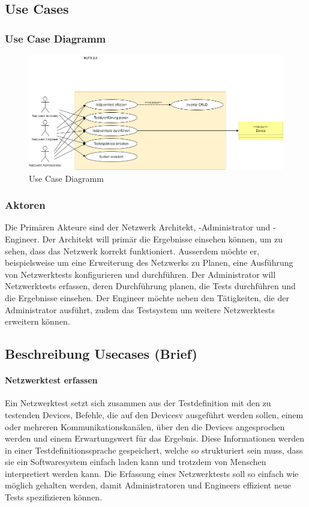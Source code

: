 \documentclass[]{subfiles}
\begin{document}
    \newpage

    \subsection{Use Cases}
    \subsubsection{Use Case Diagramm}
    \begin{figure}[!h] 
        \centering
        \includegraphics[scale=0.5]{../../99_Vorlagen/Bilder/UseCaseDiagram.png}
        \caption{Use Case Diagramm}
    \end{figure}
    \subsubsection{Aktoren}
    Die Primären Akteure sind der Netzwerk Architekt, -Administrator und -Engineer. 
    Der Architekt will primär die Ergebnisse einsehen können, um zu sehen, dass
    das Netzwerk korrekt funktioniert. 
    Ausserdem möchte er, beispielsweise um eine Erweiterung des Netzwerks zu 
    Planen, eine Ausführung von Netzwerktests konfigurieren und durchführen.
    Der Administrator will Netzwerktests erfassen, deren Durchführung planen, 
    die Tests durchführen und die Ergebnisse einsehen.
    Der Engineer möchte neben den Tätigkeiten, die der Administrator ausführt,
    zudem das Testsystem um weitere Netzwerktests erweitern können.

    \subsection{Beschreibung Usecases (Brief)}

        \paragraph{Netzwerktest erfassen}
        Ein Netzwerktest setzt sich zusammen aus der Testdefinition mit den zu testenden Devices, 
        Befehle, die auf den Devicesv ausgeführt werden sollen, einem oder mehreren 
        Kommunikationskanälen, über den die Devices angesprochen werden
        und einem Erwartungswert für das Ergebnis. 
        Diese Informationen werden in einer Testdefinitionssprache gespeichert, 
        welche so strukturiert sein muss, dass sie ein Softwaresystem einfach laden 
        kann und trotzdem von Menschen interpretiert werden kann. 
        Die Erfassung eines Netzwerktests soll so einfach wie möglich gehalten werden, 
        damit Administratoren und Engineers effizient neue Tests spezifizieren können.
\end{document}
